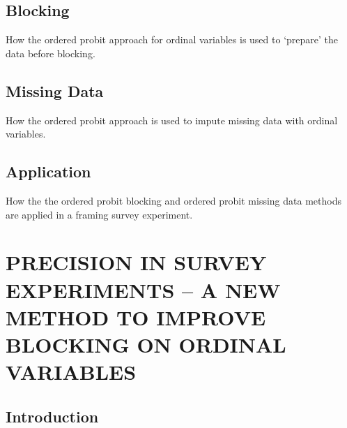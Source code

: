 \documentclass[12pt,econ]{sources/authesis}
\begin{document}
\clearpage

\hypertarget{intro-blocking}{%
\section{Blocking}\label{intro-blocking}}

How the ordered probit approach for ordinal variables is used to `prepare' the data before blocking.

\hypertarget{intro-missing}{%
\section{Missing Data}\label{intro-missing}}

How the ordered probit approach is used to impute missing data with ordinal variables.

\hypertarget{intro-application}{%
\section{Application}\label{intro-application}}

How the the ordered probit blocking and ordered probit missing data methods are applied in a framing survey experiment.

\hypertarget{ordblock}{%
\chapter{PRECISION IN SURVEY EXPERIMENTS -- A NEW METHOD TO IMPROVE BLOCKING ON ORDINAL VARIABLES}\label{ordblock}}

\hypertarget{ordblock-intro}{%
\section{Introduction}\label{ordblock-intro}}
\end{document}
